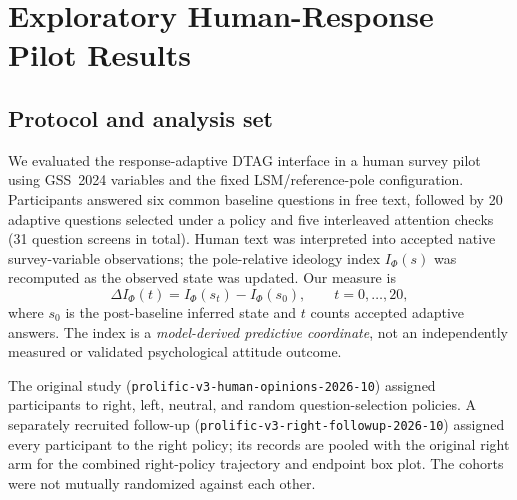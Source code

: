 %   

\section{Exploratory Human-Response Pilot Results}\label{sec:dtag-human-pilot}

\subsection{Protocol and analysis set}
We evaluated the response-adaptive DTAG interface in a human survey pilot using
GSS~2024 variables and the fixed LSM/reference-pole configuration. Participants
answered six common baseline questions in free text, followed by 20 adaptive
questions selected under a policy and five interleaved attention checks
(31 question screens in total). Human text was interpreted into accepted native
survey-variable observations; the pole-relative ideology index
$I_\Phi(s)$ was recomputed as the observed state was updated. Our measure is
\begin{equation}
  \Delta I_\Phi(t)=I_\Phi(s_t)-I_\Phi(s_0), \qquad t=0,\ldots,20,
  \label{eq:dtag-human-index-change}
\end{equation}
where $s_0$ is the post-baseline inferred state and $t$ counts accepted
adaptive answers. The index is a \emph{model-derived predictive coordinate},
not an independently measured or validated psychological attitude outcome.

The original study (\texttt{prolific-v3-human-opinions-2026-10}) assigned
participants to right, left, neutral, and random question-selection policies.
A separately recruited follow-up (\texttt{prolific-v3-right-followup-2026-10})
assigned every participant to the right policy; its records are pooled with
the original right arm for the combined right-policy trajectory and endpoint
box plot. The cohorts were not mutually randomized against each other.

